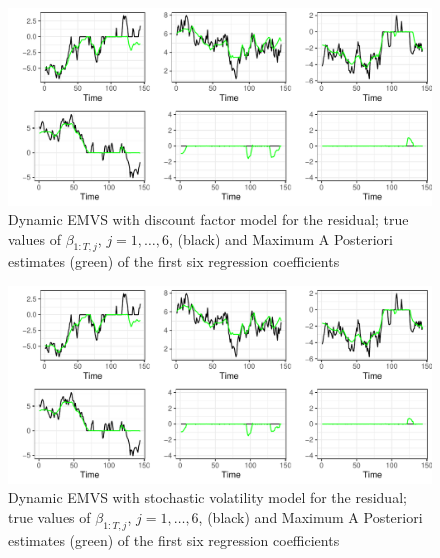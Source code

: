 \documentclass[
  12pt,
]{book}
\theoremstyle{break}
\theoremstyle{nonumberplain}
\begin{document}
\begin{figure}[H]

{\centering \includegraphics{Dynamic-Shrinkage-in-Bayesian-Structural-Time-Series-and-Vector-Autoregressive-Models_files/figure-latex/myfig9-1} 

}

\caption{Dynamic EMVS with discount factor model for the residual; true values of $\beta_{1:T, j}$, $j=1, \ldots, 6$, (black) and Maximum A Posteriori estimates (green) of the first six regression coefficients}\label{fig:myfig9}
\end{figure}

\begin{figure}[H]

{\centering \includegraphics{Dynamic-Shrinkage-in-Bayesian-Structural-Time-Series-and-Vector-Autoregressive-Models_files/figure-latex/myfig10-1} 

}

\caption{Dynamic EMVS with stochastic volatility model for the residual; true values of $\beta_{1:T,j}$, $j=1, \ldots, 6$, (black) and Maximum A Posteriori estimates (green) of the first six regression coefficients }\label{fig:myfig10}
\end{figure}
\end{document}
